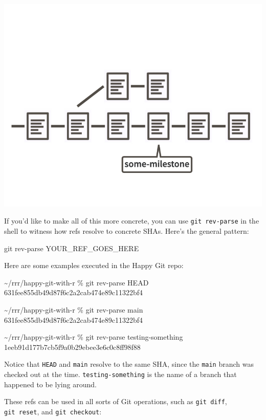 \documentclass[
]{book}
\newenvironment{Shaded}{\begin{snugshade}}{\end{snugshade}}
\newcommand{\NormalTok}[1]{#1}
\begin{document}
\begin{center}\includegraphics[width=0.6\linewidth]{img/refs-tag} \end{center}

If you'd like to make all of this more concrete, you can use \texttt{git\ rev-parse} in the shell to witness how refs resolve to concrete SHAs.
Here's the general pattern:

\begin{Shaded}
\begin{Highlighting}[]
\NormalTok{git rev{-}parse YOUR\_REF\_GOES\_HERE}
\end{Highlighting}
\end{Shaded}

Here are some examples executed in the Happy Git repo:

\begin{Shaded}
\begin{Highlighting}[]
\NormalTok{\textasciitilde{}/rrr/happy{-}git{-}with{-}r \% git rev{-}parse HEAD}
\NormalTok{631fee855db49d87f6c2a2cab474e89c11322bf4}

\NormalTok{\textasciitilde{}/rrr/happy{-}git{-}with{-}r \% git rev{-}parse main}
\NormalTok{631fee855db49d87f6c2a2cab474e89c11322bf4}

\NormalTok{\textasciitilde{}/rrr/happy{-}git{-}with{-}r \% git rev{-}parse testing{-}something                       }
\NormalTok{1eeb91d177b7cb5f9a0b29ebee3e6c0c8ff98f88}
\end{Highlighting}
\end{Shaded}

Notice that \texttt{HEAD} and \texttt{main} resolve to the same SHA, since the \texttt{main} branch was checked out at the time.
\texttt{testing-something} is the name of a branch that happened to be lying around.

These refs can be used in all sorts of Git operations, such as \texttt{git\ diff}, \texttt{git\ reset}, and \texttt{git\ checkout}:
\end{document}
